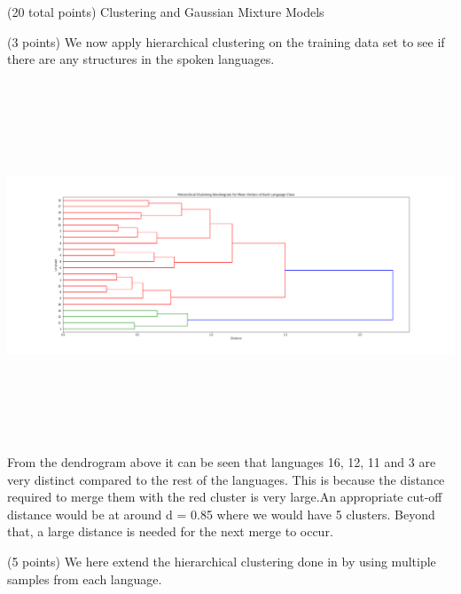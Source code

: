\documentclass[12pt]{article}
\begin{document}
\begin{question}{(20 total points) Clustering and Gaussian Mixture Models}
\begin{subquestion}{(3 points)
       We now apply hierarchical clustering on the training data set
       to see if there are any structures in the spoken languages.
     }
     

      \begin{answerbox}{35em}
         \includegraphics[width=15cm, height=11cm]{q3_3.png}
         From the dendrogram above it can be seen that languages 16, 12, 11 and 3 are very distinct compared to the rest of the languages. This is because the distance required to merge them with the red cluster is very large.An appropriate cut-off distance would be at around d = 0.85 where we would have 5 clusters. Beyond that, a large distance is needed for the next merge to occur.
         
      \end{answerbox}
  


   \end{subquestion}
   \begin{subquestion}{(5 points)
       We here extend the hierarchical clustering done in  by
       using multiple samples from each language.
     } \label{Q3.4}


   


\end{subquestion}
\end{question}
\end{document}
